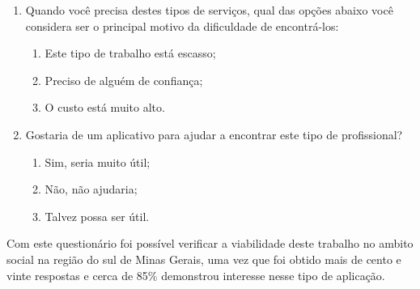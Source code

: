 \begin{enumerate}
	\item Quando você precisa destes tipos de serviços, qual das opções abaixo você considera ser o principal motivo da dificuldade de encontrá-los:
	\begin{enumerate}[label=(\alph*)]
		\item Este tipo de trabalho está escasso;
		\item Preciso de alguém de confiança;
		\item O custo está muito alto.
	\end{enumerate}
	
	\item Gostaria de um aplicativo para ajudar a encontrar este tipo de profissional?
	\begin{enumerate}[label=(\alph*)]
		\item Sim, seria muito útil;
		\item Não, não ajudaria;
		\item Talvez possa ser útil.
	\end{enumerate}	
\end{enumerate}


Com este questionário foi possível verificar a viabilidade deste trabalho no ambito social na região do sul de Minas Gerais, uma vez que foi obtido mais de cento e vinte respostas e cerca de 85\% demonstrou interesse nesse tipo de aplicação. 
